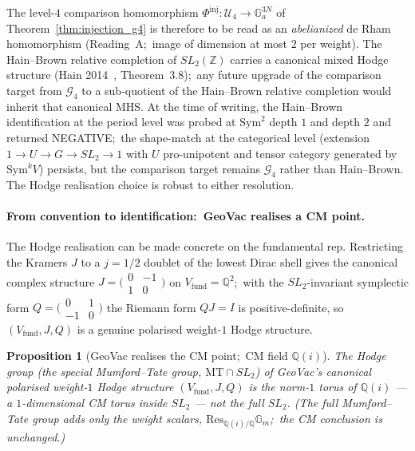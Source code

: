 \documentclass[11pt,a4paper]{article}
\theoremstyle{plain}
\newtheorem{proposition}[theorem]{Proposition}
\theoremstyle{definition}
\newcommand{\Sym}{\mathrm{Sym}}
\newcommand{\Ga}{\mathbb{G}_{a}}
\newcommand{\MT}{\mathrm{MT}}
\newcommand{\Q}{\mathbb{Q}}
\newcommand{\Z}{\mathbb{Z}}
\begin{document}
The level-$4$ comparison homomorphism $\Phi^{\mathrm{inj}}: \mathcal{U}_4 \to
\Ga^{3N}$ of
Theorem~\ref{thm:injection_g4} is therefore to be read as an
\emph{abelianized} de Rham homomorphism (Reading~A;\ image of dimension at
most $2$ per weight).  The Hain--Brown
relative completion of $SL_2(\Z)$ carries a canonical mixed Hodge
structure (Hain 2014~\cite{hain2014}, Theorem~3.8);\ any future
upgrade of the comparison target from $\mathcal{G}_4$ to a
sub-quotient of the Hain--Brown relative completion would inherit
that canonical MHS.  At the time of writing, the Hain--Brown
identification at the period level was probed at $\Sym^2$ depth $1$
and depth $2$ and returned NEGATIVE;\ the
shape-match at the categorical level (extension
$1 \to U \to G \to SL_2 \to 1$ with $U$ pro-unipotent and tensor
category generated by $\Sym^k V$) persists, but the comparison
target remains $\mathcal{G}_4$ rather than Hain--Brown.  The Hodge
realisation choice is robust to either resolution.

\paragraph{From convention to identification:\ GeoVac realises a CM
point.}  The Hodge realisation can be made concrete on the fundamental
rep.  Restricting the Kramers $J$ to a $j = 1/2$ doublet of the lowest
Dirac shell gives the canonical complex structure
$J = \bigl(\begin{smallmatrix} 0 & -1 \\ 1 & 0 \end{smallmatrix}\bigr)$
on $V_{\mathrm{fund}} = \Q^2$;\ with the $SL_2$-invariant symplectic form
$Q = \bigl(\begin{smallmatrix} 0 & 1 \\ -1 & 0 \end{smallmatrix}\bigr)$
the Riemann form $QJ = I$ is positive-definite, so $(V_{\mathrm{fund}},
J, Q)$ is a genuine polarised weight-$1$ Hodge structure.

\begin{proposition}[GeoVac realises the CM point;\ CM field $\Q(i)$]
\label{prop:hodge_cm_point}
The Hodge group (the special Mumford--Tate group, $\MT \cap SL_2$) of
GeoVac's canonical polarised weight-$1$ Hodge structure
$(V_{\mathrm{fund}}, J, Q)$ is the norm-$1$ torus of $\Q(i)$
--- a $1$-dimensional CM torus inside $SL_2$ --- \emph{not} the full
$SL_2$.  (The full Mumford--Tate group adds only the weight scalars,
$\mathrm{Res}_{\Q(i)/\Q}\mathbb{G}_m$;\ the CM conclusion is unchanged.)
\end{proposition}
\end{document}
